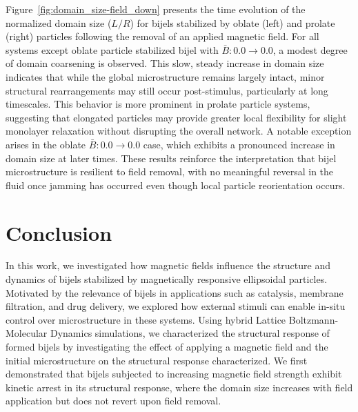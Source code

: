 Figure~\ref{fig:domain_size-field_down} presents the time evolution of the normalized domain size (\(L/R\)) for bijels stabilized by oblate 
(left) and prolate (right) particles following the removal of an applied magnetic field. For all systems except oblate particle stabilized 
bijel with \(\bar{B}: 0.0 \rightarrow 0.0\), a modest degree of domain coarsening is observed. This slow, steady increase in domain size 
indicates that while the global microstructure remains largely intact, minor structural rearrangements may still occur post-stimulus, particularly 
at long timescales. This behavior is more prominent in prolate particle systems, suggesting that elongated particles 
may provide greater local flexibility for slight monolayer relaxation without disrupting the overall network.
A notable exception arises in the oblate \(\bar{B}: 0.0 \rightarrow 0.0\) case, which exhibits a pronounced 
increase in domain size at later times. These results reinforce the interpretation that bijel microstructure 
is resilient to field removal, with no meaningful reversal in the fluid once jamming has occurred even though local particle reorientation occurs.

\section{Conclusion}

In this work, we investigated how magnetic fields influence the structure and dynamics of bijels stabilized by magnetically responsive ellipsoidal particles. Motivated 
by the relevance of bijels in applications such as catalysis, membrane filtration, and drug delivery, we explored how external stimuli can enable in-situ control over 
microstructure in these systems. Using hybrid Lattice Boltzmann-Molecular Dynamics simulations, we characterized the structural response of formed bijels by investigating
the effect of applying a magnetic field and the initial microstructure on the structural response characterized. We first demonstrated that bijels subjected to increasing 
magnetic field strength exhibit kinetic arrest in its structural response, where the domain size increases with field application but does not revert upon field removal.


